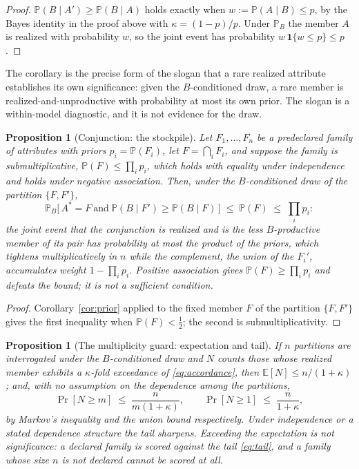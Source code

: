 \documentclass[11pt]{article}
\newcommand{\E}{\mathbb{E}}
\newcommand{\PP}{\mathbb{P}}
\newcommand{\one}{\mathbf{1}}
\theoremstyle{plain}
\newtheorem{proposition}[theorem]{Proposition}
\theoremstyle{definition}
\theoremstyle{remark}
\begin{document}
\begin{proof}
$\PP(B\mid A')\ge\PP(B\mid A)$ holds exactly when $w:=\PP(A\mid B)\le p$,
by the Bayes identity in the proof above with $\kappa=(1-p)/p$. Under
$\PP_B$ the member $A$ is realized with probability $w$, so the joint
event has probability $w\,\one\{w\le p\}\le p$.
\end{proof}

\noindent The corollary is the precise form of the slogan that a rare
realized attribute establishes its own significance: given the
$B$-conditioned draw, a rare member is realized-and-unproductive with
probability at most its own prior. The slogan is a within-model
diagnostic, and it is not evidence for the draw.

\begin{proposition}[Conjunction: the stockpile]\label{prop:stockpile}
Let $F_1,\dots,F_n$ be a predeclared family of attributes with priors
$p_i=\PP(F_i)$, let $F=\bigcap_iF_i$, and suppose the family is
\emph{submultiplicative}, $\PP(F)\le\prod_ip_i$, which holds with
equality under independence and holds under negative association. Then,
under the $B$-conditioned draw of the partition $\{F,F'\}$,
\begin{equation}\label{eq:stockpile}
\PP_B\bigl[\,A^\ast=F\ \text{and}\ \PP(B\mid F')\ge\PP(B\mid F)\,\bigr]
\;\le\;\PP(F)\;\le\;\prod_ip_i:
\end{equation}
the joint event that the conjunction is realized and is the less
$B$-productive member of its pair has probability at most the product
of the priors, which tightens multiplicatively in $n$ while the
complement, the union of the $F_i'$, accumulates weight $1-\prod_ip_i$.
Positive association gives $\PP(F)\ge\prod_ip_i$ and defeats the bound;
it is not a sufficient condition.
\end{proposition}

\begin{proof}
Corollary~\ref{cor:prior} applied to the fixed member $F$ of the
partition $\{F,F'\}$ gives the first inequality when $\PP(F)<\tfrac12$;
the second is submultiplicativity.
\end{proof}

\begin{proposition}[The multiplicity guard: expectation and tail]
\label{prop:guard}
If $n$ partitions are interrogated under the $B$-conditioned draw and
$N$ counts those whose realized member exhibits a $\kappa$-fold
exceedance of \eqref{eq:accordance}, then $\E[N]\le n/(1+\kappa)$; and,
with no assumption on the dependence among the partitions,
\begin{equation}\label{eq:tail}
\Pr[N\ge m]\;\le\;\frac{n}{m(1+\kappa)},\qquad
\Pr[N\ge1]\;\le\;\frac{n}{1+\kappa},
\end{equation}
by Markov's inequality and the union bound respectively. Under
independence or a stated dependence structure the tail sharpens.
Exceeding the expectation is not significance: a declared family is
scored against the tail \eqref{eq:tail}, and a family whose size $n$ is
not declared cannot be scored at all.
\end{proposition}
\end{document}
